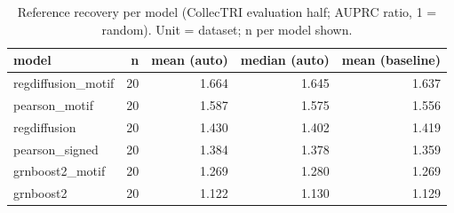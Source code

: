 \begin{table}[H]\centering\small
\caption{Reference recovery per model (CollecTRI evaluation half; AUPRC ratio, 1 = random). Unit = dataset; n per model shown.}
\begin{tabular}{lrrrr}\toprule
model & n & mean (auto) & median (auto) & mean (baseline) \\ \midrule
regdiffusion\_motif & 20 & 1.664 & 1.645 & 1.637 \\
pearson\_motif & 20 & 1.587 & 1.575 & 1.556 \\
regdiffusion & 20 & 1.430 & 1.402 & 1.419 \\
pearson\_signed & 20 & 1.384 & 1.378 & 1.359 \\
grnboost2\_motif & 20 & 1.269 & 1.280 & 1.269 \\
grnboost2 & 20 & 1.122 & 1.130 & 1.129 \\
\bottomrule\end{tabular}\end{table}

